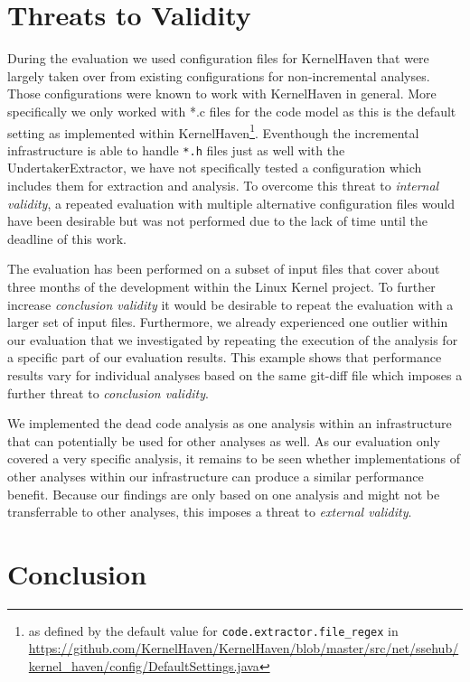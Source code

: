 \documentclass[a4paper]{article}
\begin{document}
\section{Threats to Validity}\label{threats-to-validity}

During the evaluation we used configuration files for KernelHaven that were largely taken over from existing configurations for non-incremental analyses. Those configurations were known to work with KernelHaven in general. More specifically we only worked with *.c files for the code model as this is the default setting as implemented within KernelHaven\footnote{as defined by the default value for \texttt{code.extractor.file\_regex} in \url{https://github.com/KernelHaven/KernelHaven/blob/master/src/net/ssehub/kernel_haven/config/DefaultSettings.java}}. Eventhough the incremental infrastructure is able to handle \texttt{*.h} files just as well with the UndertakerExtractor, we have not specifically tested a configuration which includes them for extraction and analysis. To overcome this threat to \emph{internal validity}, a repeated evaluation with multiple alternative configuration files would have been desirable but was not performed due to the lack of time until the deadline of this work.

The evaluation has been performed on a subset of input files that cover about three months of the development within the Linux Kernel project. To further increase  \emph{conclusion validity} it would be desirable to repeat the evaluation with a larger set of input files. Furthermore, we already experienced one outlier within our evaluation that we investigated by repeating the execution of the analysis for a specific part of our evaluation results. This example shows that  performance results vary for individual analyses based on the same git-diff file which imposes a further threat to \emph{conclusion validity}.

We implemented the dead code analysis as one analysis within an infrastructure that can potentially be used for other analyses as well. As our evaluation only covered a very specific analysis, it remains to be seen whether implementations of other analyses within our infrastructure can produce a similar performance benefit. Because our findings are only based on one analysis and might not be transferrable to other analyses, this imposes a threat to \emph{external validity}.


\clearpage
\newpage
\section{Conclusion}\label{conclusion}
\end{document}
